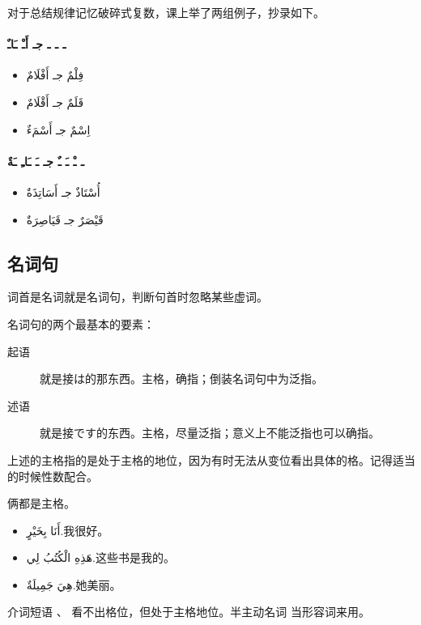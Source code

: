 \begin{note}
    对于总结规律记忆破碎式复数，课上举了两组例子，抄录如下。
    \begin{Arabic}
        \begin{multicols}{2}
            \paragraph{ـ ـ ـ جـ أَـْ ـَاـٌ}
            \begin{itemize}
                \item فِلْمٌ جـ أَفْلَامٌ
                \item قَلَمٌ جـ أَقْلَامٌ
                \item اِسْمٌ جـ أَسْمَءٌ
            \end{itemize}

            \paragraph{ـ ـْ ـَ ـٌ جـ ـَ ـَاـِ ـَةٌ}
            \begin{itemize}
                \item أُسْتَاذٌ جـ أَسَاتِذَةٌ
                \item قَيْصَرٌ جـ قَيَاصِرَةٌ
            \end{itemize}
        \end{multicols}
    \end{Arabic}
\end{note}

\subsection{ 名词句}

词首是名词就是名词句，判断句首时忽略某些虚词。

名词句的两个最基本的要素：

\begin{description}
    \item[起语] 就是接は的那东西。主格，确指；倒装名词句中为泛指。
    \item[述语] 就是接です的东西。主格，尽量泛指；意义上不能泛指也可以确指。
\end{description}

上述的主格指的是处于主格的地位，因为有时无法从变位看出具体的格。记得适当的时候性数配合。

\begin{note}
    俩都是主格。
\end{note}

\begin{itemize}
    \item \ac{أَنَا بِخَيْرٍ.}{我很好。}
    \item \ac{هَذِهِ الْكُتُبُ لِي.}{这些书是我的。}
    \item \ac{هِيَ جَمِيلَةٌ.}{她美丽。}
\end{itemize}

介词短语 、  看不出格位，但处于主格地位。半主动名词  当形容词来用。